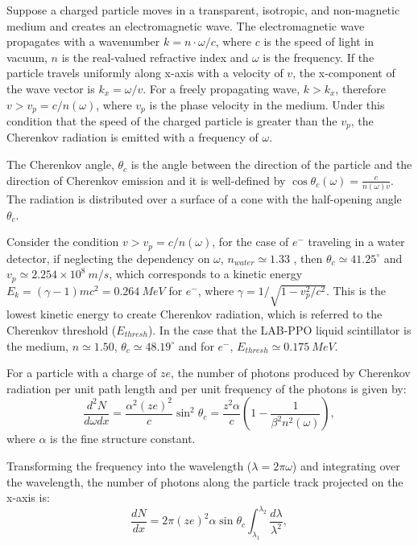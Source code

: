 Suppose a charged particle moves in a transparent, isotropic, and non-magnetic medium and creates an electromagnetic wave. The electromagnetic wave propagates with a wavenumber $k=n\cdot\omega/c$, where $c$ is the speed of light in vacuum, $n$ is the real-valued refractive index and $\omega$ is the frequency. If the particle travels uniformly along x-axis with a velocity of $v$, the x-component of the wave vector is $k_x=\omega/v$. For a freely propagating wave, $k>k_x$, therefore $v>v_p=c/n(\omega)$, where $v_p$ is the phase velocity in the medium. Under this condition that the speed of the charged particle is greater than the $v_p$, the Cherenkov radiation is emitted with a frequency of $\omega$\cite{landau2013electrodynamics}.   

The Cherenkov angle, $\theta_c$ is the angle between the direction of the particle and the direction of Cherenkov emission and it is well-defined by $\cos\theta_c(\omega) = \frac{c}{n(\omega)v}$. The radiation is distributed over a surface of a cone with the half-opening angle $\theta_c$. 

Consider the condition $v>v_p=c/n(\omega)$, for the case of $e^-$ traveling in a water detector, if neglecting the dependency on $\omega$, $n_{water}\simeq 1.33$ \cite{pdg2020}, then $\theta_c\simeq 41.25^\circ$ and $v_p\simeq 2.254\times10^8~m/s$, which corresponds to a kinetic energy $E_k=(\gamma-1)mc^2=0.264~MeV$ for $e^-$, where $\gamma=1/\sqrt{1-v_p^2/c^2}$. This is the lowest kinetic energy to create Cherenkov radiation, which is referred to the Cherenkov threshold ($E_{thresh}$). In the case that the LAB-PPO liquid scintillator is the medium, $n\simeq 1.50$\cite{tseung2011ellipsometric}, $\theta_c\simeq 48.19^\circ$ and for $e^-$, $E_{thresh}\simeq 0.175~MeV$.   

For a particle with a charge of $ze$, the number of photons produced by Cherenkov radiation per unit path length and per unit frequency of the photons is given by\cite{leo2012techniques}:
\begin{equation}
\frac{d^2N}{d\omega dx}=\frac{\alpha^2 (ze)^2}{c}\sin^2\theta_c=\frac{z^2\alpha}{c}(1-\frac{1}{\beta^2 n^2(\omega)}),
\end{equation}
where $\alpha$ is the fine structure constant.

Transforming the frequency into the wavelength ($\lambda=2\pi\omega$) and integrating over the wavelength, the number of photons along the particle track projected on the x-axis is\cite{leo2012techniques}:
\begin{equation}
\frac{dN}{dx}=2\pi (ze)^2\alpha\sin\theta_c\int_{\lambda_1}^{\lambda_2}\frac{d\lambda}{\lambda^2},
\end{equation}

